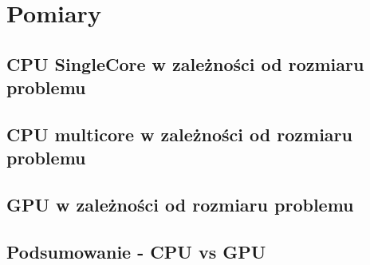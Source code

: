 \section{Pomiary}

\subsection{CPU SingleCore w zależności od rozmiaru problemu}


\subsection{CPU multicore w zależności od rozmiaru problemu}

\subsection{GPU w zależności od rozmiaru problemu}


\subsection{Podsumowanie - CPU vs GPU}
